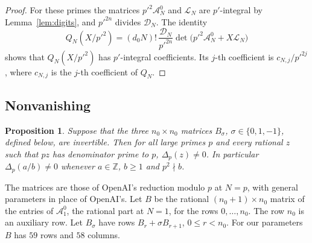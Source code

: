 \documentclass[11pt]{amsart}
\newtheorem{proposition}[theorem]{Proposition}
\theoremstyle{definition}
\theoremstyle{remark}
\numberwithin{equation}{section}
\newcommand{\Z}{\mathbb Z}
\newcommand{\cA}{\mathcal A}
\newcommand{\cL}{\mathcal L}
\newcommand{\cD}{\mathcal D}
\begin{document}
\begin{proof}
For these primes the matrices $p'^2\cA^0_N$ and $\cL_N$ are $p'$-integral by Lemma~\ref{lem:digits}, and
$p'^{2n}$ divides $\cD_N$. The identity
\[
 Q_N(X/p'^2)=(d_0N)!\,\frac{\cD_N}{p'^{2n}}\det\bigl(p'^2\cA^0_N+X\cL_N\bigr)
\]
shows that $Q_N(X/p'^2)$ has $p'$-integral coefficients. Its $j$-th coefficient is $c_{N,j}/p'^{2j}$, where
$c_{N,j}$ is the $j$-th coefficient of $Q_N$.
\end{proof}

\subsection{Nonvanishing}
\begin{proposition}\label{prop:nonvanishing}
Suppose that the three $n_0\times n_0$ matrices $B_\sigma$, $\sigma\in\{0,1,-1\}$, defined below, are
invertible. Then for all large primes $p$ and every rational $z$ such that $pz$ has denominator prime to
$p$, $\Delta_p(z)\ne0$. In particular $\Delta_p(a/b)\ne0$ whenever $a\in\Z$, $b\ge1$ and $p^2\nmid b$.
\end{proposition}

The matrices are those of OpenAI's reduction modulo $p$ at $N=p$, with general parameters in place of
OpenAI's. Let $B$ be the rational $(n_0+1)\times n_0$ matrix of the entries of $\cA^0_1$, the rational part at
$N=1$, for the rows $0,\dots,n_0$. The row $n_0$ is an auxiliary row. Let $B_\sigma$ have rows
$B_r+\sigma B_{r+1}$, $0\le r<n_0$. For our parameters $B$ has $59$ rows and $58$ columns.
\end{document}
